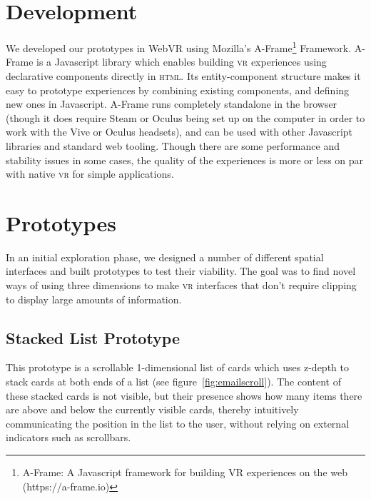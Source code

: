 \documentclass[nobib]{tufte-book} %
\begin{document}
\section{Development}
We developed our prototypes in WebVR using Mozilla's A-Frame\footnote{A-Frame: A Javascript framework for building VR experiences on the web (https://a-frame.io)} Framework. A-Frame is a Javascript library which enables building \textsc{vr} experiences using declarative components directly in \textsc{html}. Its entity-component structure makes it easy to prototype experiences by combining existing components, and defining new ones in Javascript. A-Frame runs completely standalone in the browser (though it does require Steam or Oculus being set up on the computer in order to work with the Vive or Oculus headsets), and can be used with other Javascript libraries and standard web tooling. Though there are some performance and stability issues in some cases, the quality of the experiences is more or less on par with native \textsc{vr} for simple applications.

\section{Prototypes}
In an initial exploration phase, we designed a number of different spatial interfaces and built prototypes to test their viability. The goal was to find novel ways of using three dimensions to make \textsc{vr} interfaces that don't require clipping to display large amounts of information.

\subsection{Stacked List Prototype}
This prototype is a scrollable 1-dimensional list of cards which uses z-depth to stack cards at both ends of a list (see figure~\ref{fig:emailscroll}). The content of these stacked cards is not visible, but their presence shows how many items there are above and below the currently visible cards, thereby intuitively communicating the position in the list to the user, without relying on external indicators such as scrollbars.
\end{document}
